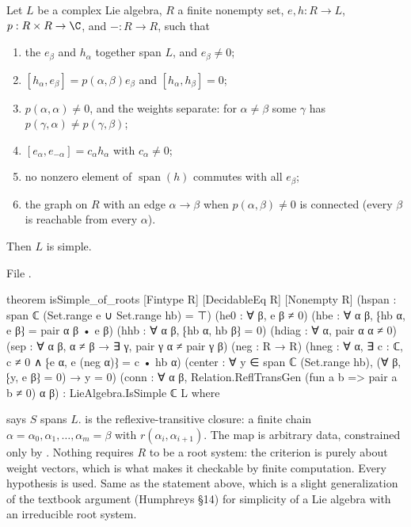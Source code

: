\begin{theorem}\label{l23:thm:rootspace}
Let $L$ be a complex Lie algebra, $R$ a finite nonempty set, $e,h:R\to L$, $p:R\times R\to\C$, and $-:R\to R$, such that
\begin{enumerate}
\item the $e_\beta$ and $h_\alpha$ together span $L$, and $e_\beta\ne0$;
\item $[h_\alpha,e_\beta]=p(\alpha,\beta)e_\beta$ and $[h_\alpha,h_\beta]=0$;
\item $p(\alpha,\alpha)\ne0$, and the weights separate: for $\alpha\ne\beta$ some $\gamma$ has $p(\gamma,\alpha)\ne p(\gamma,\beta)$;
\item $[e_\alpha,e_{-\alpha}]=c_\alpha h_\alpha$ with $c_\alpha\neq0$;
\item no nonzero element of $\operatorname{span}(h)$ commutes with all $e_\beta$;
\item the graph on $R$ with an edge $\alpha\to\beta$ when $p(\alpha,\beta)\ne0$ is connected (every $\beta$ is reachable from every
  $\alpha$).
\end{enumerate}
Then $L$ is simple.
\end{theorem}
\noindent File .
\begin{leancode}
theorem isSimple_of_roots [Fintype R] [DecidableEq R] [Nonempty R]
    (hspan : span ℂ (Set.range e ∪ Set.range hb) = ⊤)
    (he0 : ∀ β, e β ≠ 0)
    (hbe : ∀ α β, ⁅hb α, e β⁆ = pair α β • e β)
    (hhb : ∀ α β, ⁅hb α, hb β⁆ = 0)
    (hdiag : ∀ α, pair α α ≠ 0)
    (sep : ∀ α β, α ≠ β → ∃ γ, pair γ α ≠ pair γ β)
    (neg : R → R) (hneg : ∀ α, ∃ c : ℂ, c ≠ 0 ∧ ⁅e α, e (neg α)⁆ = c • hb α)
    (center : ∀ y ∈ span ℂ (Set.range hb), (∀ β, ⁅y, e β⁆ = 0) → y = 0)
    (conn : ∀ α β, Relation.ReflTransGen (fun a b => pair a b ≠ 0) α β) :
    LieAlgebra.IsSimple ℂ L where
\end{leancode}

\begin{dictionary}
 says $S$ spans $L$.  is the reflexive-transitive closure: a finite chain
$\alpha=\alpha_0,\alpha_1,\dots,\alpha_m=\beta$ with $r(\alpha_i,\alpha_{i+1})$. The map  is arbitrary data, constrained
only by . Nothing requires $R$ to be a root system: the criterion is purely about weight vectors, which is what makes it
checkable by finite computation. Every hypothesis is used. Same as the statement above, which is a slight generalization of the
textbook argument (Humphreys \S14) for simplicity of a Lie algebra with an irreducible root system.
\end{dictionary}

